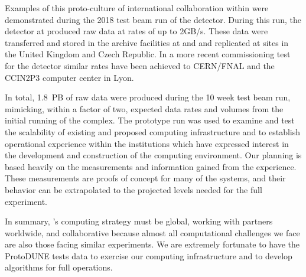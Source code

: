 Examples of this proto-culture of international collaboration within  were demonstrated during the 2018 test beam run of the  detector.  During this run, the  detector at  produced raw data at rates of up to 2GB/s.  These data were transferred and stored in the archive facilities at  and  and replicated at sites in the United Kingdom and Czech Republic.  In a more recent commissioning test for the  detector similar rates have been achieved to CERN/FNAL and the CCIN2P3 computer center in Lyon.

In total, \SI{1.8}{PB} of raw data were produced during the 10 week test beam run, mimicking, within a factor of two, expected data rates and volumes from the initial running of the  complex.  The prototype run was used to examine and test the scalability of existing and proposed computing infrastructure and to establish operational experience within the institutions which have expressed interest in the development and construction of the  computing environment.  Our planning is based heavily on the measurements and information gained from the  experience.   These measurements are proofs of concept for many of the systems, and their behavior can be extrapolated to the projected levels needed for the full  experiment. 


In summary, 's computing strategy must be global, working with partners worldwide, and collaborative because almost all computational challenges we face are also those facing similar experiments.  We are extremely fortunate to have the ProtoDUNE tests data to exercise our computing infrastructure and to develop algorithms for  full  operations.
 
